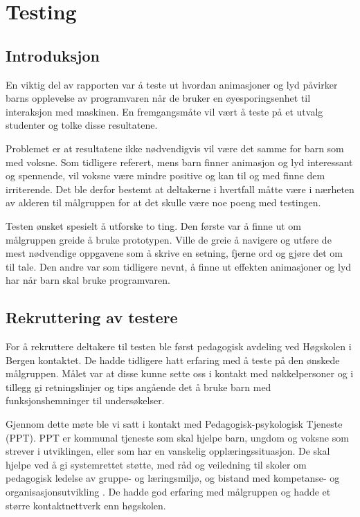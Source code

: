  
 
\chapter{Testing} 
 
\section{Introduksjon} 
 
En viktig del av rapporten var å teste ut hvordan animasjoner og lyd påvirker barns opplevelse av programvaren når de bruker en øyesporingsenhet til interaksjon med maskinen. En fremgangsmåte vil vært å teste på et utvalg studenter og tolke disse resultatene. 

Problemet er at resultatene ikke nødvendigvis vil være det samme for barn som med voksne. Som tidligere referert, mens barn finner animasjon og lyd interessant og spennende, vil voksne være mindre positive og kan til og med finne dem irriterende. Det ble derfor bestemt at deltakerne i  hvertfall måtte være i nærheten av alderen til målgruppen for at det skulle være noe poeng med testingen. 

Testen ønsket spesielt å utforske to ting. Den første var å finne ut om målgruppen greide å bruke prototypen. Ville de greie å navigere og utføre de mest nødvendige oppgavene som å skrive en setning, fjerne ord og gjøre det om til tale. Den andre var som tidligere nevnt, å finne ut effekten animasjoner og lyd har når barn skal bruke programvaren.  
 

\section{Rekruttering av testere} 
 
 
For å rekruttere deltakere til testen ble først pedagogisk avdeling ved Høgskolen i Bergen kontaktet. De hadde tidligere hatt erfaring med å teste på den ønskede målgruppen. Målet var at disse kunne sette oss i kontakt med nøkkelpersoner og i tillegg gi retningslinjer og tips angående det å bruke barn med funksjonshemninger til undersøkelser. 

Gjennom dette møte ble vi satt i kontakt med Pedagogisk-psykologisk Tjeneste (PPT). PPT er kommunal tjeneste som skal hjelpe barn, ungdom og voksne som strever i utviklingen, eller som har en vanskelig opplæringssituasjon. De skal hjelpe ved å gi systemrettet støtte, med råd og veiledning til skoler om pedagogisk ledelse av gruppe- og læringsmiljø, og bistand med kompetanse- og organisasjonsutvikling \cite{Udir.5:online}. De hadde god erfaring med målgruppen og hadde et større kontaktnettverk enn høgskolen. 

